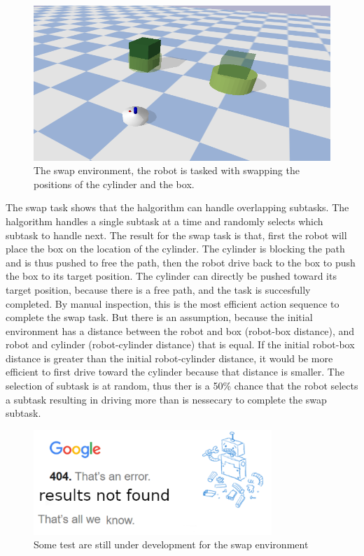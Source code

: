 \begin{figure}[H]
    \centering
    \includegraphics[width=13cm]{figures/tests/swap}
    \caption{The swap environment, the robot is tasked with swapping the positions of the cylinder and the box.}%
    \label{fig:benchmark_swap}
\end{figure}
The swap task shows that the \ac{halgorithm} can handle overlapping subtasks. The \ac{halgorithm} handles a single subtask at a time and randomly selects which subtask to handle next. The result for the swap task is that, first the robot will place the box on the location of the cylinder. The cylinder is blocking the path and is thus pushed to free the path, then the robot drive back to the box to push the box to its target position. The cylinder can directly be pushed toward its target position, because there is a free path, and the task is succesfully completed. By manual inspection, this is the most efficient action sequence to complete the swap task. But there is an assumption, because the initial environment has a distance between the robot and box (robot-box distance), and robot and cylinder (robot-cylinder distance) that is equal. If the initial robot-box distance is greater than the initial robot-cylinder distance, it would be more efficient to first drive toward the cylinder because that distance is smaller. The selection of subtask is at random, thus ther is a 50\% chance that the robot selects a subtask resulting in driving more than is nessecary to complete the swap subtask.\bs 

\begin{figure}[H]
    \centering
    \includegraphics[width=9cm]{figures/tests/404_not_found}
    \caption{Some test are still under development for the swap environment}%
    \label{fig:results_swap}
\end{figure}

